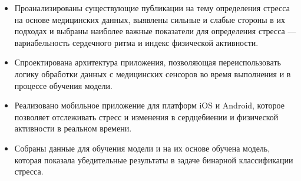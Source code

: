 \documentclass[14pt]{matmex-diploma-custom}
\begin{document}
\begin{itemize}
\item Проанализированы существующие публикации на тему определения стресса на
  основе медицинских данных, выявлены сильные и слабые стороны в их подходах и
  выбраны наиболее важные показатели для определения стресса --- вариабельность
  сердечного ритма и индекс физической активности.
\item Спроектирована архитектура приложения, позволяющая переиспользовать логику
  обработки данных с медицинских сенсоров во время выполнения и в процессе
  обучения модели.
\item Реализовано мобильное приложение для платформ iOS и Android, которое
  позволяет отслеживать стресс и изменения в сердцебиении и физической
  активности в реальном времени.
\item Собраны данные для обучения модели и на их основе обучена модель, которая
  показала убедительные результаты в задаче бинарной классификации стресса.
\end{itemize}

\setmonofont[Path=assets/fonts/, UprightFont=*-Regular, BoldFont=*-Bold,
ItalicFont=*-Italic, BoldItalicFont=*-BoldItalic,
Mapping=tex-text]{CMUTypewriterText}

 
\end{document}
